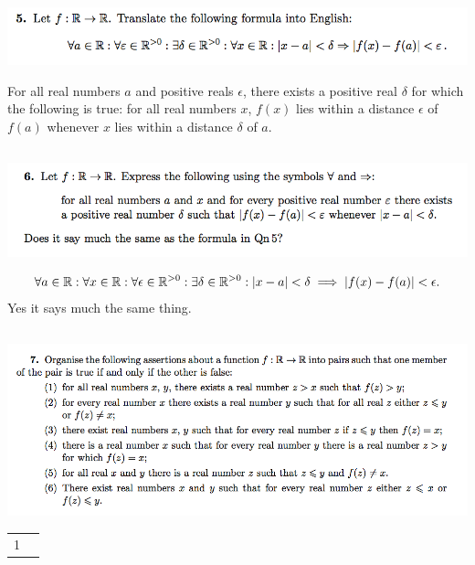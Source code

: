 \documentclass[12pt]{article}
\begin{document}
\subsection*{}
\includegraphics[width=400pt]{img/iulm-5.png}
\begin{mdframed}
  For all real numbers $a$ and positive reals $\epsilon$, there exists a
  positive real $\delta$ for which the following is true: for all real numbers
  $x$, $f(x)$ lies within a distance $\epsilon$ of $f(a)$ whenever $x$ lies
  within a distance $\delta$ of $a$.
\end{mdframed}

\subsection*{}
\includegraphics[width=400pt]{img/iulm-2-6.png}
\begin{mdframed}
  \begin{align*}
    \forall a \in \mathbb{R}: \forall x \in \mathbb{R}: \forall \epsilon \in \mathbb{R}^{>0}: \exists \delta \in \mathbb{R}^{>0}: |x - a| < \delta \implies |f(x) - f(a)| < \epsilon.
  \end{align*}
Yes it says much the same thing.
\end{mdframed}

\subsection*{}
\includegraphics[width=450pt]{img/iulm-2-7.png}
\begin{mdframed}
  \begin{tabular}{c|c}
    1 &
  \end{tabular}
\end{mdframed}
\end{document}
